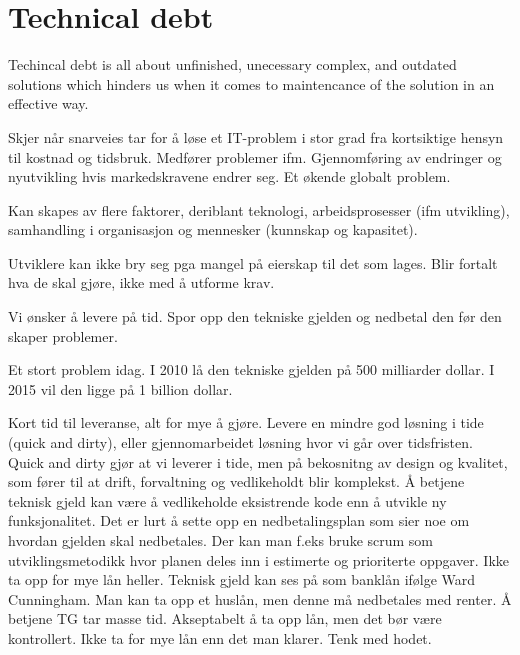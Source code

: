 \section{Technical debt}
Techincal debt is all about unfinished, unecessary complex, and outdated solutions which hinders us when it comes to maintencance of the solution in an effective way. 

Skjer når snarveies tar for å løse et IT-problem i stor grad fra kortsiktige hensyn til kostnad og tidsbruk. Medfører problemer ifm. Gjennomføring av endringer og nyutvikling hvis markedskravene endrer seg. Et økende globalt problem. 

Kan skapes av flere faktorer, deriblant teknologi, arbeidsprosesser (ifm utvikling), samhandling i organisasjon og mennesker (kunnskap og kapasitet).

Utviklere kan ikke bry seg pga mangel på eierskap til det som lages. Blir fortalt hva de skal gjøre, ikke med å utforme krav.

Vi ønsker å levere på tid. Spor opp den tekniske gjelden og nedbetal den før den skaper problemer.

Et stort problem idag. I 2010 lå den tekniske gjelden på 500 milliarder dollar. I 2015 vil den ligge på 1 billion dollar.

Kort tid til leveranse, alt for mye å gjøre. Levere en mindre god løsning i tide (quick and dirty), eller gjennomarbeidet løsning hvor vi går over tidsfristen. Quick and dirty gjør at vi leverer i tide, men på bekosnitng av design og kvalitet, som fører til at drift, forvaltning og vedlikeholdt blir komplekst. Å betjene teknisk gjeld kan være å vedlikeholde eksistrende kode enn å utvikle ny funksjonalitet. Det er lurt å sette opp en nedbetalingsplan som sier noe om hvordan gjelden skal nedbetales. Der kan man f.eks bruke scrum som utviklingsmetodikk hvor planen deles inn i estimerte og prioriterte oppgaver. Ikke ta opp for mye lån heller. Teknisk gjeld kan ses på som banklån ifølge Ward Cunningham. Man kan ta opp et huslån, men denne må nedbetales med renter. Å betjene TG tar masse tid. Akseptabelt å ta opp lån, men det bør være kontrollert. Ikke ta for mye lån enn det man klarer. Tenk med hodet. 

